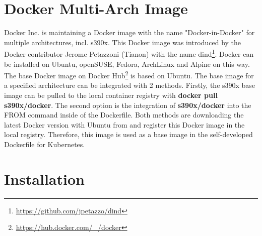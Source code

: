 \section{Docker Multi-Arch Image}

Docker Inc. is maintaining a Docker image with the name "Docker-in-Docker" for multiple architectures, incl. s390x. 
This Docker image was introduced by the Docker contributor Jerome Petazzoni (Tianon) with the name dind\footnote{\url{https://github.com/jpetazzo/dind}}. Docker can be installed on Ubuntu, openSUSE, Fedora, ArchLinux and Alpine on this way.
The base Docker image on Docker Hub\footnote{\url{https://hub.docker.com/_/docker}} is based on Ubuntu.
The base image for a specified architecture can be integrated with 2 methods. Firstly, the s390x base image can be pulled to the local container registry with \textbf{docker pull s390x/docker}. The second option is the integration of \textbf{s390x/docker} into the FROM command inside of the Dockerfile. Both methods are downloading the latest Docker version with Ubuntu from  and register this Docker image in the local registry.
Therefore, this image is used as a base image in the self-developed Dockerfile for Kubernetes.


\section{Installation}

